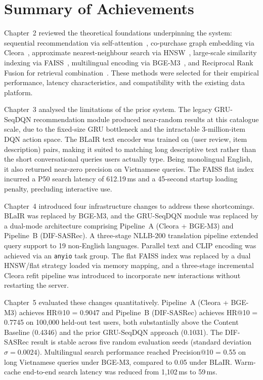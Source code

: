\section{Summary of Achievements}
\label{sec:conclusion_summary}

Chapter~2 reviewed the theoretical foundations underpinning the system: sequential recommendation via self-attention~\cite{kang2018self,sun2019bert4rec}, co-purchase graph embedding via Cleora~\cite{rychalska2021cleora}, approximate nearest-neighbour search via HNSW~\cite{malkov2018hnsw}, large-scale similarity indexing via FAISS~\cite{johnson2021faiss}, multilingual encoding via BGE-M3~\cite{chen2024bge}, and Reciprocal Rank Fusion for retrieval combination~\cite{cormack2009rrf}.
These methods were selected for their empirical performance, latency characteristics, and compatibility with the existing data platform.

Chapter~3 analysed the limitations of the prior system.
The legacy GRU-SeqDQN recommendation module produced near-random results at this catalogue scale, due to the fixed-size GRU bottleneck and the intractable 3-million-item DQN action space.
The BLaIR text encoder was trained on (user review, item description) pairs, making it suited to matching long descriptive text rather than the short conversational queries users actually type. Being monolingual English, it also returned near-zero precision on Vietnamese queries.
The FAISS flat index incurred a P50 search latency of 612.19\,ms and a 45-second startup loading penalty, precluding interactive use.

Chapter~4 introduced four infrastructure changes to address these shortcomings.
BLaIR was replaced by BGE-M3, and the GRU-SeqDQN module was replaced by a dual-mode architecture comprising Pipeline~A (Cleora + BGE-M3) and Pipeline~B (DIF-SASRec).
A three-stage NLLB-200 translation pipeline extended query support to 19 non-English languages.
Parallel text and CLIP encoding was achieved via an \texttt{anyio} task group.
The flat FAISS index was replaced by a dual HNSW/flat strategy loaded via memory mapping, and a three-stage incremental Cleora refit pipeline was introduced to incorporate new interactions without restarting the server.

Chapter~5 evaluated these changes quantitatively.
Pipeline~A (Cleora + BGE-M3) achieves HR@10 = 0.9047 and Pipeline~B (DIF-SASRec) achieves HR@10 = 0.7745 on 100{,}000 held-out test users, both substantially above the Content Baseline (0.4346) and the prior GRU-SeqDQN approach (0.1031).
The DIF-SASRec result is stable across five random evaluation seeds (standard deviation $\sigma = 0.0024$).
Multilingual search performance reached Precision@10 = 0.55 on long Vietnamese queries under BGE-M3, compared to 0.05 under BLaIR.
Warm-cache end-to-end search latency was reduced from 1{,}102\,ms to 59\,ms.

